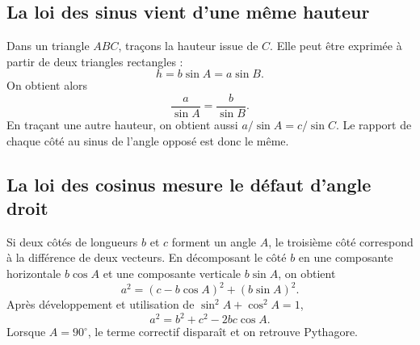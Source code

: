 \subsection{La loi des sinus vient d'une même hauteur}
Dans un triangle $ABC$, traçons la hauteur issue de $C$. Elle peut être exprimée à partir de deux triangles rectangles :
\[
h=b\sin A=a\sin B.
\]
On obtient alors
\[
\frac a{\sin A}=\frac b{\sin B}.
\]
En traçant une autre hauteur, on obtient aussi $a/\sin A=c/\sin C$. Le rapport de chaque côté au sinus de l'angle opposé est donc le même.

\begin{center}
\end{center}

\subsection{La loi des cosinus mesure le défaut d'angle droit}
Si deux côtés de longueurs $b$ et $c$ forment un angle $A$, le troisième côté correspond à la différence de deux vecteurs. En décomposant le côté $b$ en une composante horizontale $b\cos A$ et une composante verticale $b\sin A$, on obtient
\[
a^2=(c-b\cos A)^2+(b\sin A)^2.
\]
Après développement et utilisation de $\sin^2A+\cos^2A=1$,
\[
a^2=b^2+c^2-2bc\cos A.
\]
Lorsque $A=90^\circ$, le terme correctif disparaît et on retrouve Pythagore.

\begin{center}
\end{center}

